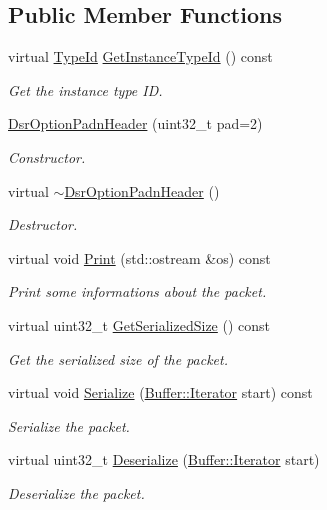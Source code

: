 \subsection*{Public Member Functions}
\begin{DoxyCompactItemize}
\item 
virtual \hyperlink{classns3_1_1TypeId}{Type\+Id} \hyperlink{classns3_1_1dsr_1_1DsrOptionPadnHeader_a51651333da7d94b3c4b356bdaafabe71}{Get\+Instance\+Type\+Id} () const 
\begin{DoxyCompactList}\small\item\em Get the instance type ID. \end{DoxyCompactList}\item 
\hyperlink{classns3_1_1dsr_1_1DsrOptionPadnHeader_a071af15cedad9f6265690c07b7ad270e}{Dsr\+Option\+Padn\+Header} (uint32\+\_\+t pad=2)
\begin{DoxyCompactList}\small\item\em Constructor. \end{DoxyCompactList}\item 
virtual \hyperlink{classns3_1_1dsr_1_1DsrOptionPadnHeader_a96f666c7a4cbbd5b109b6836a50545dd}{$\sim$\+Dsr\+Option\+Padn\+Header} ()
\begin{DoxyCompactList}\small\item\em Destructor. \end{DoxyCompactList}\item 
virtual void \hyperlink{classns3_1_1dsr_1_1DsrOptionPadnHeader_aadc148f33b7f0b7f6c5b4538e62e7c0e}{Print} (std\+::ostream \&os) const 
\begin{DoxyCompactList}\small\item\em Print some informations about the packet. \end{DoxyCompactList}\item 
virtual uint32\+\_\+t \hyperlink{classns3_1_1dsr_1_1DsrOptionPadnHeader_af01fe2eea5d65f81ca5149bb2415c116}{Get\+Serialized\+Size} () const 
\begin{DoxyCompactList}\small\item\em Get the serialized size of the packet. \end{DoxyCompactList}\item 
virtual void \hyperlink{classns3_1_1dsr_1_1DsrOptionPadnHeader_a7b433c99b9f9c2abbe6488953b0b4c7a}{Serialize} (\hyperlink{classns3_1_1Buffer_1_1Iterator}{Buffer\+::\+Iterator} start) const 
\begin{DoxyCompactList}\small\item\em Serialize the packet. \end{DoxyCompactList}\item 
virtual uint32\+\_\+t \hyperlink{classns3_1_1dsr_1_1DsrOptionPadnHeader_aba1dc34ff93da84dc1a9db15134cd140}{Deserialize} (\hyperlink{classns3_1_1Buffer_1_1Iterator}{Buffer\+::\+Iterator} start)
\begin{DoxyCompactList}\small\item\em Deserialize the packet. \end{DoxyCompactList}\end{DoxyCompactItemize}
